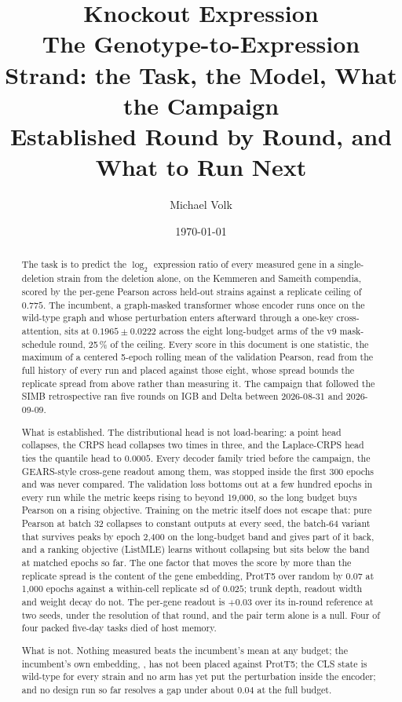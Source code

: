 \documentclass[10pt,a4paper]{article}
\title{\vspace{-1.5em}Knockout Expression\\
  {\large The Genotype-to-Expression Strand: the Task, the Model, What the Campaign\\
   Established Round by Round, and What to Run Next}}
\author{Michael Volk}
\date{\today}
\begin{document}
\maketitle
\thispagestyle{empty}

\begin{abstract}
\noindent
The task is to predict the $\log_2$ expression ratio of every measured gene in a
single-deletion strain from the deletion alone, on the Kemmeren and Sameith compendia,
scored by the per-gene Pearson across held-out strains against a replicate ceiling of
$0.775$. The incumbent, a graph-masked transformer whose encoder runs once on the
wild-type graph and whose perturbation enters afterward through a one-key cross-attention,
sits at $0.1965 \pm 0.0222$ across the eight long-budget arms of the v9 mask-schedule
round, 25\,\% of the ceiling. Every score in this document is one statistic, the maximum
of a centered 5-epoch rolling mean of the validation Pearson, read from the full history
of every run and placed against those eight, whose spread bounds the replicate spread
from above rather than measuring it. The campaign that followed the SIMB retrospective ran
five rounds on IGB and Delta between 2026-08-31 and 2026-09-09.

What is established. The distributional head is not load-bearing: a point head collapses,
the CRPS head collapses two times in three, and the Laplace-CRPS head ties the quantile
head to $0.0005$. Every decoder family tried before the campaign, the GEARS-style
cross-gene readout among them, was stopped inside the first 300 epochs and was never
compared. The validation loss bottoms out at a few hundred epochs in every run while the
metric keeps rising to beyond 19,000, so the long budget buys Pearson on a rising
objective. Training on the metric itself does not escape that: pure Pearson at batch 32
collapses to constant outputs at every seed, the batch-64 variant that survives peaks by
epoch 2,400 on the long-budget band and gives part of it back, and a ranking objective
(ListMLE) learns without collapsing but sits below the band at matched epochs so far. The
one factor that moves the score by more than the replicate spread is the content of the
gene embedding, ProtT5 over random by $0.07$ at 1,000 epochs against a within-cell
replicate sd of $0.025$; trunk depth, readout width and weight decay do not. The per-gene
readout is $+0.03$ over its in-round reference at two seeds, under the resolution of that
round, and the pair term alone is a null. Four of four packed five-day tasks died of host
memory.

What is not. Nothing measured beats the incumbent's mean at any budget; the incumbent's
own embedding, , has not been placed against ProtT5; the CLS state is
wild-type for every strain and no arm has yet put the perturbation inside the encoder;
and no design run so far resolves a gap under about $0.04$ at the full budget.
\end{abstract}
\end{document}

